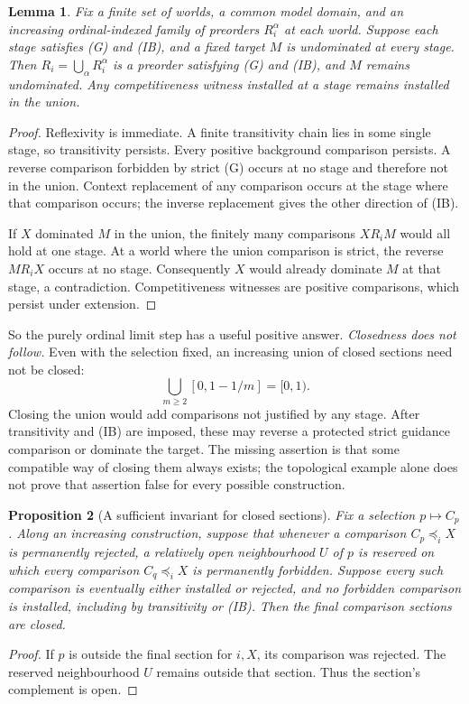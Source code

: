 \documentclass[11pt]{article}
\newtheorem{proposition}{Proposition}
\newtheorem{lemma}[proposition]{Lemma}
\theoremstyle{remark}\newtheorem{remark}[proposition]{Remark}
\begin{document}
\begin{lemma}\label{lem:union}
Fix a finite set of worlds, a common model domain, and an increasing
ordinal-indexed family of preorders $R_i^\alpha$ at each world. Suppose
each stage satisfies (G) and (IB), and a fixed target $M$ is undominated
at every stage. Then $R_i=\bigcup_\alpha R_i^\alpha$ is a preorder
satisfying (G) and (IB), and $M$ remains undominated. Any competitiveness
witness installed at a stage remains installed in the union.
\end{lemma}
\begin{proof}
Reflexivity is immediate. A finite transitivity chain lies in some
single stage, so transitivity persists. Every positive background
comparison persists. A reverse comparison forbidden by strict (G)
occurs at no stage and therefore not in the union. Context replacement
of any comparison occurs at the stage where that comparison occurs;
the inverse replacement gives the other direction of (IB).

If $X$ dominated $M$ in the union, the finitely many comparisons
$X R_i M$ would all hold at one stage. At a world where the union
comparison is strict, the reverse $M R_i X$ occurs at no stage.
Consequently $X$ would already dominate $M$ at that stage, a
contradiction. Competitiveness witnesses are positive comparisons,
which persist under extension.
\end{proof}

So the purely ordinal limit step has a useful positive answer.
\emph{Closedness does not follow.} Even with the selection fixed, an
increasing union of closed sections need not be closed:
\[
 \bigcup_{m\ge2}[0,1-1/m]=[0,1).
\]
Closing the union would add comparisons not justified by any stage.
After transitivity and (IB) are imposed, these may reverse a protected
strict guidance comparison or dominate the target. The missing
assertion is that some compatible way of closing them always exists;
the topological example alone does not prove that assertion false for
every possible construction.

\begin{proposition}[A sufficient invariant for closed sections]
Fix a selection $p\mapsto C_p$. Along an increasing construction,
suppose that whenever a comparison $C_p\preceq_iX$ is permanently
rejected, a relatively open neighbourhood $U$ of $p$ is reserved on
which every comparison $C_q\preceq_iX$ is permanently forbidden.
Suppose every such comparison is eventually either installed or
rejected, and no forbidden comparison is installed, including by
transitivity or (IB). Then the final comparison sections are closed.
\end{proposition}
\begin{proof}
If $p$ is outside the final section for $i,X$, its comparison was
rejected. The reserved neighbourhood $U$ remains outside that section.
Thus the section's complement is open.
\end{proof}
\end{document}
